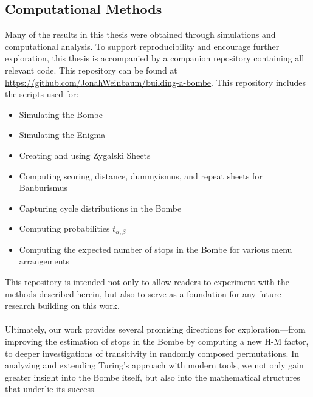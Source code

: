 \subsection{Computational Methods}
Many of the results in this thesis were obtained through simulations
and computational analysis. To support reproducibility and encourage
further exploration, this thesis is accompanied by a companion
repository containing all relevant code.
This repository can be found at
\url{https://github.com/JonahWeinbaum/building-a-bombe}. This
repository includes the scripts used for:
\begin{itemize}
  \item Simulating the Bombe
  \item Simulating the Enigma
  \item Creating and using Zygalski Sheets
  \item Computing scoring, distance, dummyismus, and repeat sheets
    for Banburismus
  \item Capturing cycle distributions in the Bombe
  \item Computing probabilities $t_{\alpha,\beta}$
  \item Computing the expected number of stops in the Bombe for
    various menu arrangements
\end{itemize}
This repository is intended not only to allow readers to experiment
with the methods described herein, but also to serve as a foundation
for any future research building on this work.
\\\\Ultimately, our work provides several promising directions for
exploration—from improving the estimation of stops in the Bombe by
computing a new H-M factor, to deeper investigations of transitivity
in randomly composed permutations. In analyzing and extending
Turing’s approach with modern tools, we not only gain greater insight
into the Bombe itself, but also into the mathematical structures that
underlie its success.

